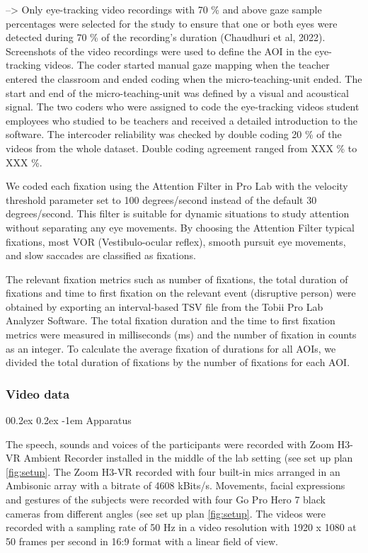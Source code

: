 \documentclass[
  man]{apa6}
\makeatletter
\let\oldparagraph\paragraph
\renewcommand{\paragraph}{
    \@ifstar
      \xxxParagraphStar
      \xxxParagraphNoStar
  }
\newcommand{\xxxParagraphStar}[1]{\oldparagraph*{#1}\mbox{}}
\newcommand{\xxxParagraphNoStar}[1]{\oldparagraph{#1}\mbox{}}
\renewcommand{\paragraph}{\@startsection{paragraph}{4}{\parindent}%
  {0\baselineskip \@plus 0.2ex \@minus 0.2ex}%
  {-1em}%
  {\normalfont\normalsize\bfseries\itshape\typesectitle}}
\makeatother
\begin{document}
--\textgreater{} Only eye-tracking video recordings with 70 \% and above gaze sample percentages were selected for the study to ensure that one or both eyes were detected during 70 \% of the recording's duration (Chaudhuri et al, 2022). Screenshots of the video recordings were used to define the AOI in the eye-tracking videos. The coder started manual gaze mapping when the teacher entered the classroom and ended coding when the micro-teaching-unit ended. The start and end of the micro-teaching-unit was defined by a visual and acoustical signal. The two coders who were assigned to code the eye-tracking videos student employees who studied to be teachers and received a detailed introduction to the software. The intercoder reliability was checked by double coding 20 \% of the videos from the whole dataset. Double coding agreement ranged from XXX \% to XXX \%.

We coded each fixation using the Attention Filter in Pro Lab with the velocity threshold parameter set to 100 degrees/second instead of the default 30 degrees/second. This filter is suitable for dynamic situations to study attention without separating any eye movements. By choosing the Attention Filter typical fixations, most VOR (Vestibulo-ocular reflex), smooth pursuit eye movements, and slow saccades are classified as fixations.

The relevant fixation metrics such as number of fixations, the total duration of fixations and time to first fixation on the relevant event (disruptive person) were obtained by exporting an interval-based TSV file from the Tobii Pro Lab Analyzer Software. The total fixation duration and the time to first fixation metrics were measured in milliseconds (ms) and the number of fixation in counts as an integer. To calculate the average fixation of durations for all AOIs, we divided the total duration of fixations by the number of fixations for each AOI.

\subsubsection{Video data}\label{video-data}

\paragraph{Apparatus}\label{apparatus-1}

The speech, sounds and voices of the participants were recorded with Zoom H3-VR Ambient Recorder installed in the middle of the lab setting (see set up plan \ref{fig:setup}. The Zoom H3-VR recorded with four built-in mics arranged in an Ambisonic array with a bitrate of 4608 kBits/s. Movements, facial expressions and gestures of the subjects were recorded with four Go Pro Hero 7 black cameras from different angles (see set up plan \ref{fig:setup}. The videos were recorded with a sampling rate of 50 Hz in a video resolution with 1920 x 1080 at 50 frames per second in 16:9 format with a linear field of view.
\end{document}
